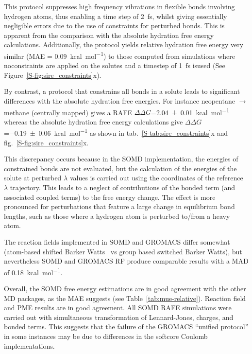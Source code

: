 \documentclass[journal=jctcce,manuscript=article]{achemso}
\begin{document}
This protocol suppresses high frequency vibrations in flexible bonds involving hydrogen atoms, thus enabling a time
step of \SI{2}{fs}, whilst giving essentially negligible errors due to the use of constraints for perturbed bonds.  This is apparent from the comparison with the absolute hydration free energy calculations.  Additionally, the protocol
yields relative hydration free energy very similar  (MAE =
\SI{0.09}{kcal.mol^{-1}}) to those computed from simulations where noconstraints are applied on the solutes and a timestep of \SI{1}{fs} isused (See Figure~\ref{S-fig:sire_constraints}x).

By contrast, a protocol that constrains all bonds in a solute leads to
significant differences with the absolute hydration free energies. For instance
neopentane $\rightarrow$ methane (centrally mapped) gives a RAFE
$\Delta\Delta G$=\SI{2.04 +- 0.01}{kcal.mol^{-1}}  whereas the absolute
hydration free energy calculations give $\Delta\Delta
G$=\SI{-0.19+-0.06}{kcal.mol^{-1}} as shown in
tab.~\ref{S-tab:sire_constraints}x and fig.~\ref{S-fig:sire_constraints}x.

This discrepancy occurs because in the SOMD implementation, the energies of constrained bonds are not evaluated, but the calculation of the energies of the solute at perturbed $\lambda$ values is carried out using the coordinates of the reference $\lambda$ trajectory. This leads to a neglect of contributions of
the bonded term (and associated coupled terms) to the free energy change. The effect is more pronounced for perturbations that feature a large change in equilibrium bond lengths, such as those where a hydrogen atom is perturbed
to/from a heavy atom.

%
The reaction fields implemented in SOMD and GROMACS differ somewhat (atom-based
shifted Barker Watts~\cite{doi:10.1080/00268977300102101} vs group based
switched Barker Watts), but nevertheless SOMD and GROMACS RF produce comparable results with a MAD of \SI{0.18}{kcal.mol^{-1}}.

Overall, the SOMD free energy estimations are in good agreement with the
other MD packages, as the MAE suggests (see Table~\ref{tab:mue-relative}).
Reaction field and PME
results are in good agreement.  All SOMD RAFE simulations were carried out with simultaneous transformation of Lennard-Jones, charges, and bonded terms. This suggests that the failure of the GROMACS ``unified protocol'' in some instances may be due to differences in the softcore Coulomb implementations.
\end{document}
